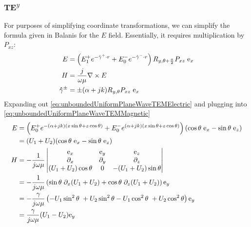 \documentclass{article}
\numberwithin{equation}{section}
\begin{document}
\subsubsection*{TE\textsuperscript{$y$}}
For purposes of simplifying coordinate transformations, we can simplify the formula given in Balanis for the $E$ field. Essentially, it requires multiplication by $P_{xz}$:
\begin{subequations} \label{eq:unboundedUniformPlaneWaveTEM}
    \begin{align}
    E &= \left( E_1^+ e^{-\hat{\gamma}^+ \cdot r} + E_0^- e^{-\hat{\gamma}^- \cdot r} \right) R_{y, \theta + \frac{\pi}{2} } P_{xz} \hspace{0.3em} \text{e}_x \label{eq:unboundedUniformPlaneWaveTEMElectric} \\
    H &= \frac{j}{\omega \mu} \nabla \times E \label{eq:unboundedUniformPlaneWaveTEMMagnetic} \\
    \mathbf{\hat{\gamma}}^{\pm} &= \pm ( \alpha + jk )R_{y, \theta} P_{xz} \hspace{0.3em} \text{e}_x 
    \end{align}
\end{subequations}
Expanding out \eqref{eq:unboundedUniformPlaneWaveTEMElectric} and plugging into \eqref{eq:unboundedUniformPlaneWaveTEMMagnetic}
\begin{align*}
    E &= \left( E_0^+ e^{-(\alpha + jk)(x \sin \theta + z \cos \theta)} + E_0^- e^{(\alpha + jk)(x \sin \theta + z \cos \theta)} \right) ( \cos \theta \hspace{0.3em} \text{e}_x - \sin \theta \hspace{0.3em} \text{e}_z ) \\
    &= (U_1 + U_2)( \cos \theta \hspace{0.3em} \text{e}_x - \sin \theta \hspace{0.3em} \text{e}_z ) \\
    H &= - \frac{1}{j \omega \mu} \begin{vmatrix} \text{e}_x & \text{e}_y & \text{e}_z \\ \partial_x & \partial_y & \partial_z \\ (U_1 + U_2) \cos \theta & 0 & - (U_1 + U_2)\sin \theta \end{vmatrix} \\
    &= -\frac{1}{j \omega \mu} \left( \sin \theta \hspace{0.3em} \partial_x (U_1 + U_2) + \cos \theta \hspace{0.3em} \partial_z (U_1 + U_2) \right) \text{e}_y \\
    &= - \frac{\gamma }{j \omega \mu} \left( -U_1 \sin^2 \theta \hspace{0.3em} + U_2 \sin^2 \theta -U_1 \cos^2 \theta \hspace{0.3em} + U_2 \cos^2 \theta \right) \text{e}_y \\
    &= \frac{\gamma}{j \omega \mu}(U_1 - U_2) \text{e}_y
\end{align*}
\end{document}
